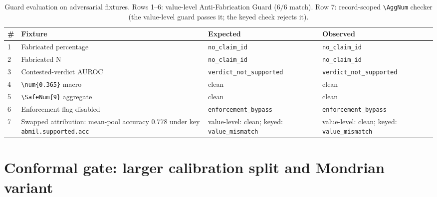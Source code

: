 \documentclass{article}
\newcommand{\SafeNum}[1]{#1}
\begin{document}
\begin{table}[h]
\centering
\caption{Guard evaluation on adversarial fixtures. Rows 1--6: value-level Anti-Fabrication Guard ($\SafeNum{6}/\SafeNum{6}$ match). Row 7: record-scoped \texttt{\textbackslash AggNum} checker (the value-level guard passes it; the keyed check rejects it).}
\label{tab:guard-eval}
\small
\begin{tabular}{@{}lp{4.3cm}p{3.9cm}p{3.9cm}@{}}
\toprule
\# & Fixture & Expected & Observed \\
\midrule
1 & Fabricated percentage      & \texttt{no\_claim\_id}          & \texttt{no\_claim\_id} \\
2 & Fabricated N               & \texttt{no\_claim\_id}          & \texttt{no\_claim\_id} \\
3 & Contested-verdict AUROC    & \texttt{verdict\_not\_supported}& \texttt{verdict\_not\_supported} \\
4 & \texttt{\textbackslash num\{0.365\}} macro     & clean              & clean \\
5 & \texttt{\textbackslash SafeNum\{9\}} aggregate & clean              & clean \\
6 & Enforcement flag disabled  & \texttt{enforcement\_bypass}    & \texttt{enforcement\_bypass} \\
\midrule
7 & Swapped attribution: mean-pool accuracy $\SafeNum{0.778}$ under key \texttt{abmil.supported.acc} & value-level: clean; keyed: \texttt{value\_mismatch} & value-level: clean; keyed: \texttt{value\_mismatch} \\
\bottomrule
\end{tabular}
\end{table}

\section{Conformal gate: larger calibration split and Mondrian variant}
\label{app:conformal-variants}
\end{document}
